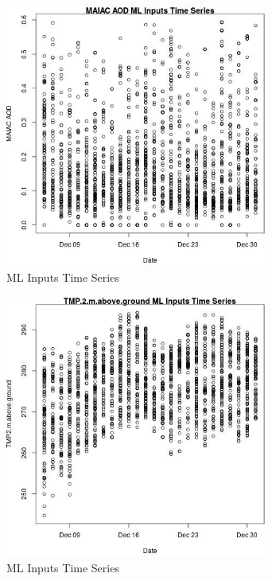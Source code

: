 \begin{figure} 
\centering  
\includegraphics[width=0.77\textwidth]{Code_Outputs/Report_ML_input_PM25_Step4_part_e_de_duplicated_aves_MAIAC_AODvDate.jpg} 
\caption{\label{fig:Report_ML_input_PM25_Step4_part_e_de_duplicated_avesMAIAC_AODvDate}ML Inputs Time Series} 
\end{figure} 
 

\begin{figure} 
\centering  
\includegraphics[width=0.77\textwidth]{Code_Outputs/Report_ML_input_PM25_Step4_part_e_de_duplicated_aves_TMP2mabovegroundvDate.jpg} 
\caption{\label{fig:Report_ML_input_PM25_Step4_part_e_de_duplicated_avesTMP2mabovegroundvDate}ML Inputs Time Series} 
\end{figure} 
 


